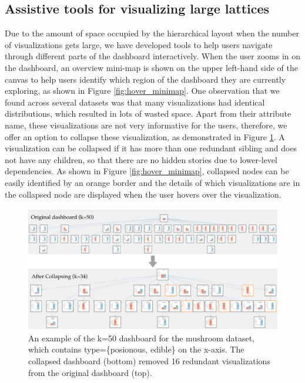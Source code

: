 \subsection{Assistive tools for visualizing large lattices\label{sec:navigation}}
Due to the amount of space occupied by the hierarchical layout when the number of visualizations gets large, we have developed tools to help users navigate through different parts of the dashboard interactively.
  When the user zooms in on the dashboard, an overview mini-map is shown on the upper left-hand side of the canvas to help users identify which region of the dashboard they are currently exploring, as shown in Figure \ref{fig:hover_minimap}.
One observation that we found across several datasets was that many visualizations had identical distributions, which resulted in lots of wasted space. Apart from their attribute name, these visualizations are not very informative for the users, therefore, we offer an option to collapse these visualization, as demonstrated in Figure \ref{fig:collapse_demo}. A visualization can be collapsed if it has more than one redundant sibling and does not have any children, so that there are no hidden stories due to lower-level dependencies. As shown in Figure \ref{fig:hover_minimap}, collapsed nodes can be easily identified by an orange border and the details of which visualizations are in the collapsed node are displayed when the user hovers over the visualization.
\begin{figure}[ht!]
\centering
\includegraphics[width=\linewidth]{figures/collapsed_example.png}
\caption{An example of the k=50 dashboard for the mushroom dataset\cite{mushroom}, which contains type=\{posionous, edible\} on the x-axis. The collapsed dashboard (bottom) removed 16 redundant visualizations from the original dashboard (top).}
\label{fig:collapse_demo}
\end{figure}

